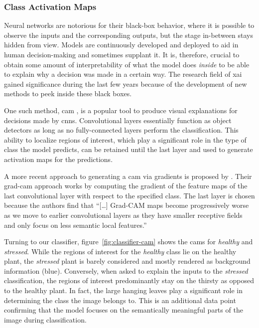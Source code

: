 \documentclass[draft,final]{vutinfth} %
\begin{document}
\subsubsection{Class Activation Maps}
\label{sssec:classifier-cam}

Neural networks are notorious for their black-box behavior, where it
is possible to observe the inputs and the corresponding outputs, but
the stage in-between stays hidden from view. Models are continuously
developed and deployed to aid in human decision-making and sometimes
supplant it. It is, therefore, crucial to obtain some amount of
interpretability of what the model does \emph{inside} to be able to
explain why a decision was made in a certain way. The research field
of \gls{xai} gained significance during the last few years because of
the development of new methods to peek inside these black boxes.

One such method, \gls{cam} \cite{zhou2015}, is a popular tool to
produce visual explanations for decisions made by
\glspl{cnn}. Convolutional layers essentially function as object
detectors as long as no fully-connected layers perform the
classification. This ability to localize regions of interest, which
play a significant role in the type of class the model predicts, can
be retained until the last layer and used to generate activation maps
for the predictions.

A more recent approach to generating a \gls{cam} via gradients is
proposed by \textcite{selvaraju2020}. Their \gls{grad-cam} approach
works by computing the gradient of the feature maps of the last
convolutional layer with respect to the specified class. The last
layer is chosen because the authors find that ``[…]  Grad-CAM maps
become progressively worse as we move to earlier convolutional layers
as they have smaller receptive fields and only focus on less semantic
local features.''~\cite[p.5]{selvaraju2020}

Turning to our classifier, figure~\ref{fig:classifier-cam} shows the
\glspl{cam} for \emph{healthy} and \emph{stressed}. While the regions
of interest for the \emph{healthy} class lie on the healthy plant, the
\emph{stressed} plant is barely considered and mostly rendered as
background information (blue). Conversely, when asked to explain the
inputs to the \emph{stressed} classification, the regions of interest
predominantly stay on the thirsty as opposed to the healthy plant. In
fact, the large hanging leaves play a significant role in determining
the class the image belongs to. This is an additional data point
confirming that the model focuses on the semantically meaningful parts
of the image during classification.
\end{document}
